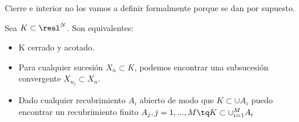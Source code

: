 \documentclass[a4paper,10pt]{apuntes}
\begin{document}
\begin{remark}
Cierre e interior no los vamos a definir formalmente porque se dan por supuesto.
\end{remark}

\begin{theorem}
Sea $K \subset \real^N$. Son equivalentes:
\begin{itemize}
 \item K cerrado y acotado.
 \item Para cualquier sucesión ${X_n} \subset K$, podemos encontrar una subsucesión convergente ${X_{n_j}} \subset{X_n}$.
 \item Dado cualquier recubrimiento ${A_i}$ abierto de modo que $K \subset \cup A_i$ puedo encontrar un recubrimiento finito ${A_j}, j=1,...,M \tq K \subset \cup_{i=1}^M A_i$
\end{itemize}
\end{theorem}
\end{document}
